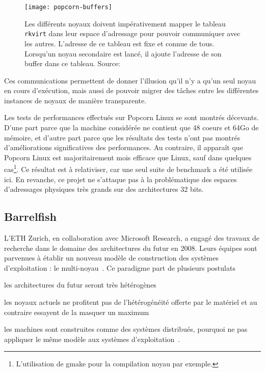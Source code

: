       \begin{figure}[h]
        \centering
        \texttt{[image: popcorn-buffers]}
        \caption{Les différents noyaux doivent impérativement mapper le tableau
          \texttt{rkvirt} dans leur espace d'adressage pour pouvoir communiquer
          avec les autres. L'adresse de ce tableau est fixe et connue de tous.
          Lorsqu'un noyau secondaire est lancé, il ajoute l'adresse de son
          buffer dans ce tableau. Source:~\citeauthor{barbalacepopcorn}}
        \label{fig:popcorn-buf}
      \end{figure}

      Ces communications permettent de donner l’illusion qu’il n’y a qu’un seul
      noyau en cours d’exécution, mais aussi de pouvoir migrer des tâches entre
      les différentes instances de noyaux de manière transparente.\newline

      Les tests de performances effectués sur Popcorn Linux se sont montrés
      décevants. D'une part parce que la machine considérée ne contient que 48
      coeurs et 64Go de mémoire, et d'autre part parce que les résultats des
      tests n'ont pas montrés d'améliorations significatives des
      performances. Au contraire, il apparaît que Popcorn Linux est
      majoritairement mois efficace que Linux, sauf dans quelques
      cas\footnote{L'utilisation de gmake pour la compilation noyau par
        exemple.}. Ce résultat est à relativiser, car une seul suite de
      benchmark a été utilisée ici. En revanche, ce projet ne s'attaque pas à la
      problématique des espaces d'adressages physiques très grands sur des
      architectures 32 bits.


    \subsection{Barrelfish}
      
      L’ETH Zurich, en collaboration avec Microsoft Research, a engagé des
      travaux de recherche dans le domaine des architectures du futur en
      2008. Leurs équipes sont parvenues à établir un nouveau modèle de
      construction des systèmes d’exploitation : le
      multi-noyau~\citep{schupbach2008embracing}. Ce paradigme part de plusieurs
      postulats\benumline \item les architectures du futur seront très
      hétérogènes \item les noyaux actuels ne profitent pas de l’hétérogénéité
      offerte par le matériel et au contraire essayent de la masquer un maximum
      \item les machines sont construites comme des systèmes distribués,
        pourquoi ne pas appliquer le même modèle aux systèmes
        d’exploitation~\citep{}\eenumline.\\

